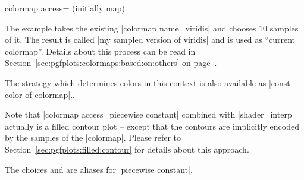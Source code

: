\begin{pgfplotskey}{colormap access= (initially map)}
\begin{codeexample}[]
\end{codeexample}
	The example takes the existing |colormap name=viridis| and chooses $10$ samples of it. The result is called |my sampled version of viridis| and is used as ``current colormap''. Details about this process can be read in Section~\ref{sec:pgfplots:colormaps:based:on:others} on page~\pageref{sec:pgfplots:colormaps:based:on:others}.

	The strategy which determines colors in this context is also available as |const color of colormap|..

	Note that |colormap access=piecewise constant| combined with |shader=interp| actually is a filled contour plot -- except that the contours are implicitly encoded by the samples of the |colormap|. Please refer to Section~\ref{sec:pgfplots:filled:contour} for details about this approach.

	The choices  and  are aliases for |piecewise constant|.
\end{pgfplotskey}

